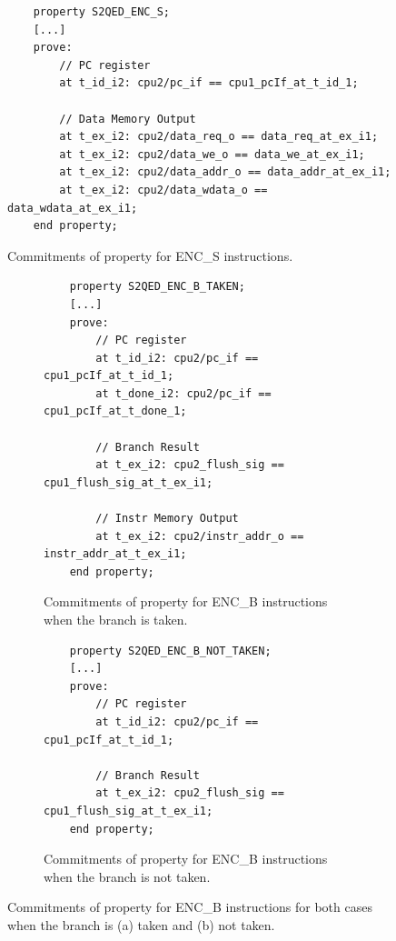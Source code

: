 \begin{figure}[htb!]
    \begin{lstlisting}
    property S2QED_ENC_S;
    [...]
    prove:
        // PC register
        at t_id_i2: cpu2/pc_if == cpu1_pcIf_at_t_id_1;
        
        // Data Memory Output
        at t_ex_i2: cpu2/data_req_o == data_req_at_ex_i1;
        at t_ex_i2: cpu2/data_we_o == data_we_at_ex_i1;
        at t_ex_i2: cpu2/data_addr_o == data_addr_at_ex_i1;
        at t_ex_i2: cpu2/data_wdata_o == data_wdata_at_ex_i1;
    end property;\end{lstlisting}
    \caption{Commitments of \SSQED{} property for ENC\_S instructions.}
    \label{fig:ri5cy-enc-s-s2qed-ppt}
\end{figure}

\begin{figure}[htb!]
     \centering
     \begin{subfigure}[b]{\textwidth}
         \begin{lstlisting}
    property S2QED_ENC_B_TAKEN;
    [...]
    prove:
        // PC register
        at t_id_i2: cpu2/pc_if == cpu1_pcIf_at_t_id_1;
        at t_done_i2: cpu2/pc_if == cpu1_pcIf_at_t_done_1;
        
        // Branch Result
        at t_ex_i2: cpu2_flush_sig == cpu1_flush_sig_at_t_ex_i1;
        
        // Instr Memory Output
        at t_ex_i2: cpu2/instr_addr_o == instr_addr_at_t_ex_i1;
    end property;\end{lstlisting}
         \caption{Commitments of \SSQED{} property for ENC\_B instructions when the branch is taken.}
         \label{fig:ri5cy-enc-b-s2qed-ppt-taken}
     \end{subfigure}
     \hfill
     \begin{subfigure}[b]{\textwidth}
         \begin{lstlisting}
    property S2QED_ENC_B_NOT_TAKEN;
    [...]
    prove:
        // PC register
        at t_id_i2: cpu2/pc_if == cpu1_pcIf_at_t_id_1;
        
        // Branch Result
        at t_ex_i2: cpu2_flush_sig == cpu1_flush_sig_at_t_ex_i1;
    end property;\end{lstlisting}
         \caption{Commitments of \SSQED{} property for ENC\_B instructions when the branch is not taken.}
         \label{fig:ri5cy-enc-b-s2qed-ppt-not-taken}
     \end{subfigure}
        \caption{Commitments of \SSQED{} property for ENC\_B instructions for both cases when the branch is (a) taken and (b) not taken.}
        \label{fig:ri5cy-enc-b-s2qed-ppt}
\end{figure}